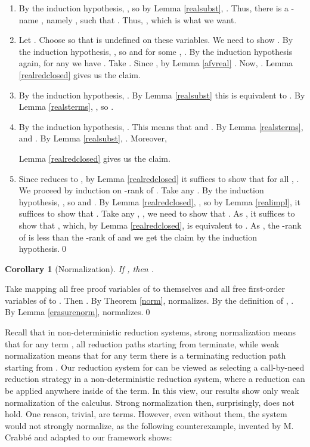\documentclass{LMCS}
\newtheorem{corollary}[thm]{Corollary}
\begin{document}
\begin{enumerate}[]
By the induction hypothesis, , so 
and . In particular . By Lemma \ref{realsubst}, . Since , Lemma \ref{realredclosed} gives us  the claim.
\item 

By the induction hypothesis, , so by Lemma
\ref{realsubst}, . Thus, there is a -name , namely , such that . Thus,
, which is what we want.
\item

Let . Choose  so that  is undefined on these variables. 
We need to
show .
By the induction hypothesis, , so  and
for some , . By the induction hypothesis again, for any  we have . Take
. Since , by Lemma
\ref{afvreal} . Now, .
Lemma \ref{realredclosed} gives us the claim.
\item 

By the induction hypothesis, . By Lemma \ref{realsubst} 
this is equivalent to .
By Lemma \ref{realsterms}, , so . 
\item

By the induction hypothesis, . This means that 
 and . 
By Lemma \ref{realsterms},  and .
By Lemma \ref{realsubst}, .
Moreover, 

 Lemma \ref{realredclosed} gives us the claim.
\item

Since  reduces to , by Lemma \ref{realredclosed} it suffices to show that for all ,
. We proceed by induction on -rank of . Take any . 
By the induction hypothesis, , so  and . By Lemma
\ref{realredclosed}, , so 
by Lemma \ref{realimpl}, it suffices to
show that .
Take any , , we need to show that
. As , it suffices
to show that , which, by Lemma \ref{realredclosed}, is equivalent to . 
As , the -rank of  is less than the
-rank of  and we get the claim by the induction hypothesis.\qed
\end{enumerate}

\begin{corollary}[Normalization]\label{cornorm}
If , then . 
\end{corollary}
\proof Take  mapping all free proof variables of  to themselves
and all free first-order variables  of  to . 
Then . By Theorem \ref{norm}, 
normalizes. By the definition of , . By Lemma
\ref{erasurenorm},  normalizes.\qed


Recall that in non-deterministic reduction systems, strong normalization means
that for any term , all reduction paths starting from  terminate, while weak normalization means
that for any term  there is a terminating reduction path starting from
. Our reduction system for  can be viewed as selecting a call-by-need reduction
strategy in a non-deterministic reduction system, where a reduction can be
applied anywhere inside of the term. In this view, our results show only
weak normalization of the calculus. Strong normalization then, surprisingly, does not hold. One reason, trivial, are
 terms. However, even without them, the system would not strongly
normalize, as the following counterexample, invented by M. Crabb\'e and adapted to our framework shows:
\end{document}
